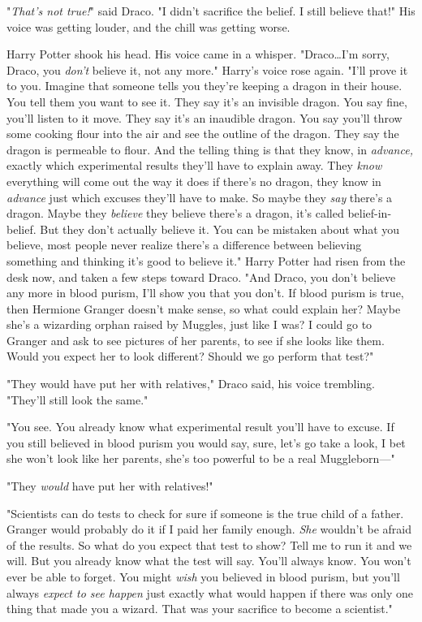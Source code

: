 "\emph{That's not true!}" said Draco. "I didn't sacrifice the belief. I still
believe that!" His voice was getting louder, and the chill was getting worse.

Harry Potter shook his head. His voice came in a whisper. "Draco…I'm
sorry, Draco, you \emph{don't} believe it, not any more." Harry's voice rose
again. "I'll prove it to you. Imagine that someone tells you they're keeping a
dragon in their house. You tell them you want to see it. They say it's an
invisible dragon. You say fine, you'll listen to it move. They say it's an
inaudible dragon. You say you'll throw some cooking flour into the air and see
the outline of the dragon. They say the dragon is permeable to flour. And the
telling thing is that they know, in \emph{advance,} exactly which experimental
results they'll have to explain away. They \emph{know} everything will come out
the way it does if there's no dragon, they know in \emph{advance} just which
excuses they'll have to make. So maybe they \emph{say} there's a dragon. Maybe
they \emph{believe} they believe there's a dragon, it's called
belief-in-belief. But they don't actually believe it. You can be mistaken about
what you believe, most people never realize there's a difference between
believing something and thinking it's good to believe it." Harry Potter had
risen from the desk now, and taken a few steps toward Draco. "And Draco, you
don't believe any more in blood purism, I'll show you that you don't. If blood
purism is true, then Hermione Granger doesn't make sense, so what could explain
her? Maybe she's a wizarding orphan raised by Muggles, just like I was? I could
go to Granger and ask to see pictures of her parents, to see if she looks like
them. Would you expect her to look different? Should we go perform that test?"

"They would have put her with relatives," Draco said, his voice trembling.
"They'll still look the same."

"You see. You already know what experimental result you'll have to excuse. If
you still believed in blood purism you would say, sure, let's go take a look, I
bet she won't look like her parents, she's too powerful to be a real
Muggleborn---"

"They \emph{would} have put her with relatives!"

"Scientists can do tests to check for sure if someone is the true child of a
father. Granger would probably do it if I paid her family enough. \emph{She}
wouldn't be afraid of the results. So what do you expect that test to show?
Tell me to run it and we will. But you already know what the test will say.
You'll always know. You won't ever be able to forget. You might \emph{wish} you
believed in blood purism, but you'll always \emph{expect to see happen} just
exactly what would happen if there was only one thing that made you a wizard.
That was your sacrifice to become a scientist."

